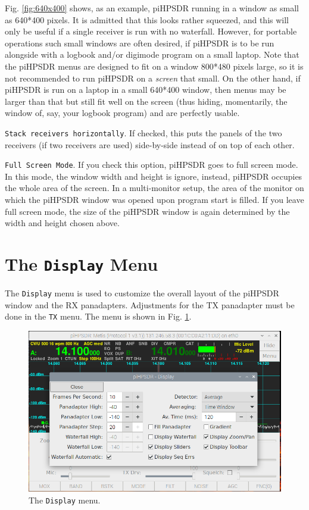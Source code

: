 \documentclass[12pt]{book}
\def\rett#1{\texttt{\color{red}#1}}
\def\bltt#1{\texttt{\color{blue}#1}}
\begin{document}
Fig. \ref{fig:640x400} shows, as an example, piHPSDR running in a window as small
as 640*400 pixels. It is admitted that this looks rather squeezed, and this
will only be useful if a single receiver is run with no waterfall. However, for
portable operations such small windows are often desired,
if piHPSDR is to be run alongside with a logbook and/or digimode program on a small laptop.
Note that the piHPSDR menus are designed to fit on a window 800*480 pixels large, so
it is not recommended to run piHPSDR on a \textit{screen} that small. On the other hand,
if piHPSDR is run on a laptop in a small 640*400 window, then menus may be larger than
that but still fit well on the screen (thus hiding, momentarily, the window of,
say, your logbook program) and are perfectly usable.

\rett{Stack receivers horizontally}. If checked, this puts the panels
of the two receivers (if two receivers are used) side-by-side instead of on top
of each other.

\rett{Full Screen Mode}. If you check this option, piHPSDR goes to full screen mode.
In this mode, the window width and height is ignore, instead, piHPSDR occupies
the whole area of the screen. In a multi-monitor setup, the area of the monitor
on which the piHPSDR window was opened upon program start is filled.
If you leave full screen mode, the size of the piHPSDR window is again
determined by the width and height chosen above.

\section{The \texttt{Display} Menu}

The \bltt{Display} menu is used to customize the overall layout of the piHPSDR
window and the RX panadapters. Adjustments
for the TX panadapter must be done in the \bltt{TX} menu. The menu is shown
in Fig. \ref{fig:DisplayMenu}.

\begin{figure}[ht]
\center
\includegraphics[width=12cm]{DisplayMenu.png}
\caption{The \bltt{Display} menu.}
\label{fig:DisplayMenu}
\end{figure}
\end{document}
